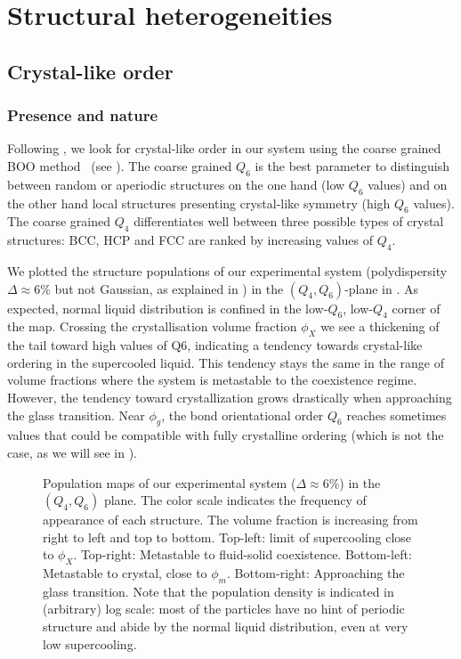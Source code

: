\chapter{Structural heterogeneities}
\label{ch:structure}

\section{Crystal-like order}
\label{sec:X_order}

\subsection{Presence and nature}

Following \citet{Kawasaki2010}, we look for crystal-like order in our system using the coarse grained \ac{BOO} method~\citep{Lechner2008} (see ). The coarse grained $Q_6$ is the best parameter to distinguish between random or aperiodic structures on the one hand (low $Q_6$ values) and on the other hand local structures presenting crystal-like symmetry (high $Q_6$ values). The coarse grained $Q_4$ differentiates well between three possible types of crystal structures: \ac{BCC}, \ac{HCP} and \ac{FCC} are ranked by increasing values of $Q_4$. 

We plotted the structure populations of our experimental system (polydispersity $\Delta \approx 6\%$ but not Gaussian, as explained in ) in the $(Q_4, Q_6)$-plane in . As expected, normal liquid distribution is confined in the low-$Q_6$, low-$Q_4$ corner of the map. Crossing the crystallisation volume fraction $\phi_X$ we see a thickening of the tail toward high values of Q6, indicating a tendency towards crystal-like ordering in the supercooled liquid. This tendency stays the same in the range of volume fractions where the system is metastable to the coexistence regime. However, the tendency toward crystallization grows drastically when approaching the glass transition. Near $\phi_g$, the bond orientational order $Q_6$ reaches sometimes values that could be compatible with fully crystalline ordering (which is not the case, as we will see in ).

\begin{figure}
	\centering
	\def\svgwidth{\textwidth}
	
	\caption{Population maps of our experimental system ($\Delta \approx 6\%$) in the $(Q_4, Q_6)$ plane. The color scale indicates the frequency of appearance of each structure. The volume fraction is increasing from right to left and top to bottom. Top-left: limit of supercooling close to $\phi_X$. Top-right: Metastable to fluid-solid coexistence. Bottom-left: Metastable to crystal, close to $\phi_m$. Bottom-right: Approaching the glass transition. Note that the population density is indicated in (arbitrary) log scale: most of the particles have no hint of periodic structure and abide by the normal liquid distribution, even at very low supercooling.}
	\label{fig:sc_Q4Q6}
\end{figure}

